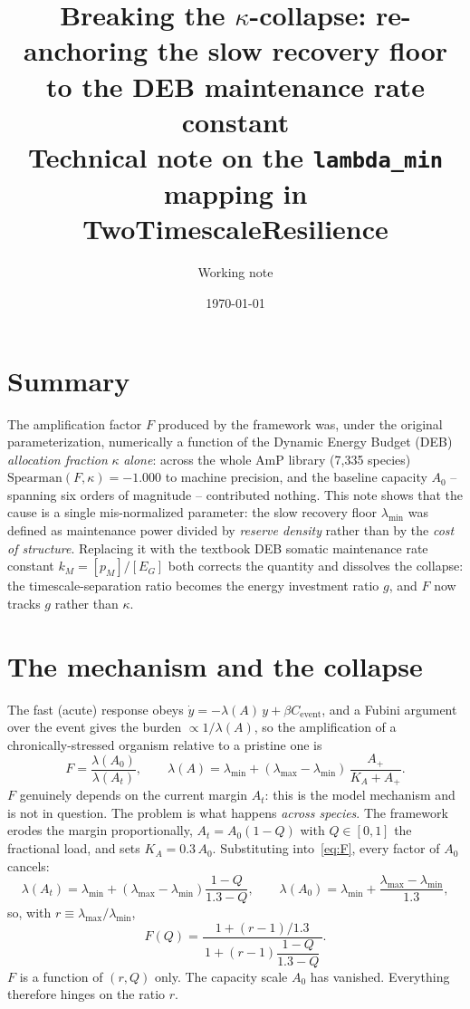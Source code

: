 \documentclass[11pt]{article}
\title{Breaking the $\kappa$-collapse: re-anchoring the slow recovery floor to the
DEB maintenance rate constant\\
\large Technical note on the \texttt{lambda\_min} mapping in TwoTimescaleResilience}
\author{Working note}
\date{\today}
\newcommand{\EG}{[E_G]}
\newcommand{\pM}{[p_M]}
\begin{document}
\maketitle

\section{Summary}
The amplification factor $F$ produced by the framework was, under the original
parameterization, numerically a function of the Dynamic Energy Budget (DEB)
\emph{allocation fraction} $\kappa$ \emph{alone}: across the whole AmP library
(7{,}335 species) $\mathrm{Spearman}(F,\kappa)=-1.000$ to machine precision, and the
baseline capacity $A_0$ -- spanning six orders of magnitude -- contributed nothing.
This note shows that the cause is a single mis-normalized parameter: the slow
recovery floor $\lambda_{\min}$ was defined as maintenance power divided by
\emph{reserve density} rather than by the \emph{cost of structure}. Replacing it with
the textbook DEB somatic maintenance rate constant $k_M=\pM/\EG$ both corrects the
quantity and dissolves the collapse: the timescale-separation ratio becomes the
energy investment ratio $g$, and $F$ now tracks $g$ rather than $\kappa$.

\section{The mechanism and the collapse}
The fast (acute) response obeys $\dot y = -\lambda(A)\,y + \beta C_{\mathrm{event}}$,
and a Fubini argument over the event gives the burden $\propto 1/\lambda(A)$, so the
amplification of a chronically-stressed organism relative to a pristine one is
\begin{equation}
F = \frac{\lambda(A_0)}{\lambda(A_t)},
\qquad
\lambda(A) = \lambda_{\min} + (\lambda_{\max}-\lambda_{\min})\,\frac{A_+}{K_A+A_+}.
\label{eq:F}
\end{equation}
$F$ genuinely depends on the current margin $A_t$: this is the model mechanism and is
not in question. The problem is what happens \emph{across species}. The framework
erodes the margin proportionally, $A_t=A_0(1-Q)$ with $Q\in[0,1]$ the fractional
load, and sets $K_A=0.3\,A_0$. Substituting into~\eqref{eq:F}, every factor of $A_0$
cancels:
\begin{equation}
\lambda(A_t)=\lambda_{\min}+(\lambda_{\max}-\lambda_{\min})\frac{1-Q}{1.3-Q},
\qquad
\lambda(A_0)=\lambda_{\min}+\frac{\lambda_{\max}-\lambda_{\min}}{1.3},
\end{equation}
so, with $r\equiv\lambda_{\max}/\lambda_{\min}$,
\begin{equation}
F(Q)=\frac{1+(r-1)/1.3}{\,1+(r-1)\dfrac{1-Q}{1.3-Q}\,}.
\label{eq:FQ}
\end{equation}
$F$ is a function of $(r,Q)$ only. The capacity scale $A_0$ has vanished. Everything
therefore hinges on the ratio $r$.
\end{document}
